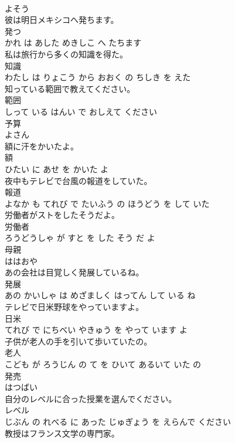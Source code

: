 \documentclass[8pt]{extreport}
\begin{document}
\begin{CJK}{UTF8}{min}
\\	よそう			
\\	彼は明日メキシコへ発ちます。	
\\	発つ 
\\	かれ は あした めきしこ へ たちます			
\\	私は旅行から多くの知識を得た。	
\\	知識 
\\	わたし は りょこう から おおく の ちしき を えた			
\\	知っている範囲で教えてください。	
\\	範囲 
\\	しって いる はんい で おしえて ください			
\\	予算	
\\	よさん			
\\	額に汗をかいたよ。	
\\	額 
\\	ひたい に あせ を かいた よ			
\\	夜中もテレビで台風の報道をしていた。	
\\	報道 
\\	よなか も てれび で たいふう の ほうどう を して いた			
\\	労働者がストをしたそうだよ。	
\\	労働者 
\\	ろうどうしゃ が すと を した そう だ よ			
\\	母親	
\\	ははおや			
\\	あの会社は目覚しく発展しているね。	
\\	発展 
\\	あの かいしゃ は めざましく はってん して いる ね			
\\	テレビで日米野球をやっていますよ。	
\\	日米 
\\	てれび で にちべい やきゅう を やって います よ			
\\	子供が老人の手を引いて歩いていたの。	
\\	老人 
\\	こども が ろうじん の て を ひいて あるいて いた の			
\\	発売	
\\	はつばい			
\\	自分のレベルに合った授業を選んでください。	
\\	レベル 
\\	じぶん の れべる に あった じゅぎょう を えらんで ください			
\\	教授はフランス文学の専門家。	

\end{CJK}
\end{document}
